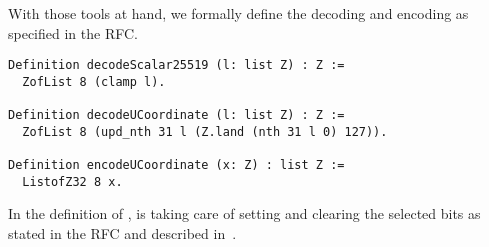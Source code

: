With those tools at hand, we formally define the decoding and encoding as
specified in the RFC.
\begin{lstlisting}[language=Coq]
Definition decodeScalar25519 (l: list Z) : Z :=
  ZofList 8 (clamp l).

Definition decodeUCoordinate (l: list Z) : Z :=
  ZofList 8 (upd_nth 31 l (Z.land (nth 31 l 0) 127)).

Definition encodeUCoordinate (x: Z) : list Z :=
  ListofZ32 8 x.
\end{lstlisting}

In the definition of ,  is taking care of
setting and clearing the selected bits as stated in the RFC and described
in~.
